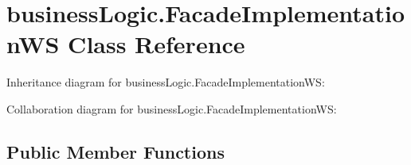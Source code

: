\hypertarget{classbusinessLogic_1_1FacadeImplementationWS}{}\section{business\+Logic.\+Facade\+Implementation\+WS Class Reference}
\label{classbusinessLogic_1_1FacadeImplementationWS}


Inheritance diagram for business\+Logic.\+Facade\+Implementation\+WS\+:


Collaboration diagram for business\+Logic.\+Facade\+Implementation\+WS\+:
\subsection*{Public Member Functions}
